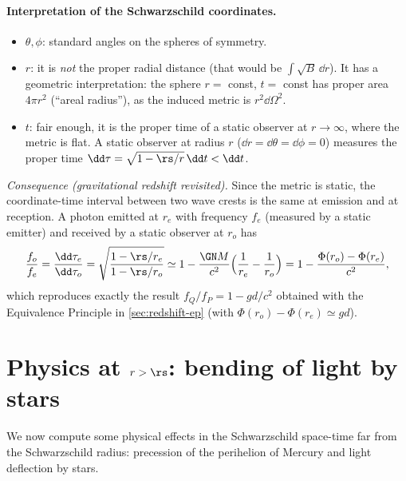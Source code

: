 \paragraph{Interpretation of the Schwarzschild coordinates.}
\begin{itemize}
\item $\theta,\phi$: standard angles on the spheres of symmetry.
\item $r$: it is \emph{not} the proper radial distance (that would be $\int\sqrt{B}\,\dd r$). It has a geometric interpretation: the sphere $r=$ const, $t=$ const has proper area $4\pi r^2$ (``areal radius''), as the induced metric is $r^2\dd\Omega^2$.
\item $t$: fair enough, it is the proper time of a static observer at $r\to\infty$, where the metric is flat. A static observer at radius $r$ ($\dd r=\dd\theta=\dd\phi=0$) measures the proper time $\dd\tau=\sqrt{1-\rs/r}\,\dd t<\dd t$.
\end{itemize}
\textit{Consequence (gravitational redshift revisited).} Since the metric is static, the coordinate-time interval between two wave crests is the same at emission and at reception. A photon emitted at $r_e$ with frequency $f_e$ (measured by a static emitter) and received by a static observer at $r_o$ has
\begin{equation}
  \frac{f_o}{f_e}=\frac{\dd\tau_e}{\dd\tau_o}=\sqrt{\frac{1-\rs/r_e}{1-\rs/r_o}}\simeq1-\frac{\GN M}{c^2}\Big(\frac1{r_e}-\frac1{r_o}\Big)=1-\frac{\Phi(r_o)-\Phi(r_e)}{c^2},
\end{equation}
which reproduces exactly the result $f_Q/f_P=1-gd/c^2$ obtained with the Equivalence Principle in \cref{sec:redshift-ep} (with $\Phi(r_o)-\Phi(r_e)\simeq gd$).

\section{Physics at $r>\rs$: bending of light by stars}\label{sec:light-bending}
We now compute some physical effects in the Schwarzschild space-time far from the Schwarzschild radius: precession of the perihelion of Mercury and light deflection by stars.

